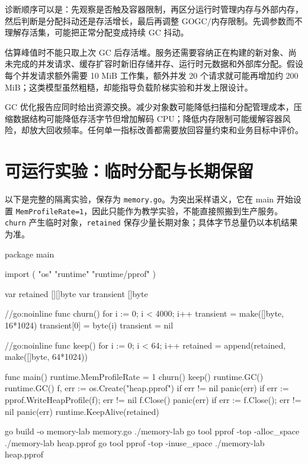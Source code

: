 \documentclass[UTF8,fontset=fandol,openany,11pt]{ctexbook}
\begin{document}
诊断顺序可以是：先观察是否触及容器限制，再区分运行时管理内存与外部内存，然后判断是分配抖动还是存活增长，最后再调整 GOGC/内存限制。先调参数而不理解存活集，可能把正常分配变成持续 GC 抖动。

估算峰值时不能只取上次 GC 后存活堆。服务还需要容纳正在构建的新对象、尚未完成的并发请求、缓存扩容时新旧存储并存、运行时元数据和外部库分配。假设每个并发请求额外需要 10 MiB 工作集，额外并发 20 个请求就可能再增加约 200 MiB；这类模型虽然粗糙，却能指导负载阶梯实验和并发上限设计。

GC 优化报告应同时给出资源交换。减少对象数可能降低扫描和分配管理成本，压缩数据结构可能降低存活字节但增加解码 CPU；降低内存限制可能缓解容器风险，却放大回收频率。任何单一指标改善都需要放回容量约束和业务目标中评价。

\section{可运行实验：临时分配与长期保留}
以下是完整的隔离实验，保存为 \texttt{memory.\allowbreak{}go}。为突出采样语义，它在 main 开始设置 \texttt{MemProfile\allowbreak{}Rate=1}，因此只能作为教学实验，不能直接照搬到生产服务。\texttt{churn} 产生临时对象，\texttt{retained} 保存少量长期对象；具体字节总量仍以本机结果为准。

\begin{codeblock}
package main

import (
	"os"
	"runtime"
	"runtime/pprof"
)

var retained [][]byte
var transient []byte

//go:noinline
func churn() {
	for i := 0; i < 4000; i++ {
		transient = make([]byte, 16*1024)
		transient[0] = byte(i)
	}
	transient = nil
}

//go:noinline
func keep() {
	for i := 0; i < 64; i++ {
		retained = append(retained, make([]byte, 64*1024))
	}
}

func main() {
	runtime.MemProfileRate = 1
	churn()
	keep()
	runtime.GC()
	runtime.GC()
	f, err := os.Create("heap.pprof")
	if err != nil {
		panic(err)
	}
	if err := pprof.WriteHeapProfile(f); err != nil {
		f.Close()
		panic(err)
	}
	if err := f.Close(); err != nil {
		panic(err)
	}
	runtime.KeepAlive(retained)
}
\end{codeblock}

\begin{codeblock}
go build -o memory-lab memory.go
./memory-lab
go tool pprof -top -alloc_space ./memory-lab heap.pprof
go tool pprof -top -inuse_space ./memory-lab heap.pprof
\end{codeblock}
\end{document}
